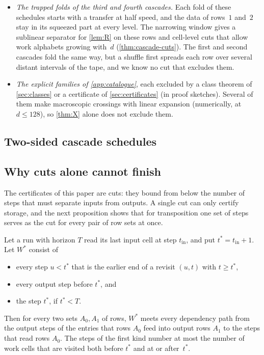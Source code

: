 \begin{itemize}[leftmargin=1.5em]
\item \emph{The trapped folds of the third and fourth cascades.} Each fold of these schedules starts with a transfer at half speed,
and the data of rows~$1$ and~$2$ stay in its squeezed part at every level. The narrowing window gives a sublinear separator for
\cref{lem:R} on these rows and cell-level cuts that allow work alphabets growing with~$d$ (\cref{thm:cascade-cuts}). The first and
second cascades fold the same way, but a shuffle first spreads each row over several distant intervals of the tape, and we know no
cut that excludes them.
\item \emph{The explicit families of \cref{app:catalogue}}, each excluded by a class theorem of \cref{sec:classes} or a certificate of
\cref{sec:certificates} (in proof sketches). Several of them make macroscopic crossings with linear expansion (numerically, at $d\le128$), so
\cref{thm:X} alone does not exclude them.
\end{itemize}

\subsection{Two-sided cascade schedules}\label{sec:cascades}



\subsection{Why cuts alone cannot finish}

The certificates of this paper are cuts: they bound from below the number of steps that must separate inputs from outputs. A
single cut can only certify storage, and the next proposition shows that for transposition one set of steps serves as the cut
for every pair of row sets at once.

\begin{proposition}\label{prop:onecut}
\notformalized
Let a run with horizon $T$ read its last input cell at step $t_{\mathrm{in}}$, and put $t^*=t_{\mathrm{in}}+1$. Let $W^*$ consist of
\begin{itemize}[leftmargin=1.5em]
\item every step $u<t^*$ that is the earlier end of a revisit $(u,t)$ with $t\ge t^*$,
\item every output step before $t^*$, and
\item the step $t^*$, if $t^*<T$.
\end{itemize}
Then for every two sets $A_0,A_1$ of rows, $W^*$ meets every dependency path from the output steps of the entries that rows $A_0$
feed into output rows $A_1$ to the steps that read rows $A_0$. The steps of the first kind number at most the number of work cells that
are visited both before $t^*$ and at or after~$t^*$.
\end{proposition}

